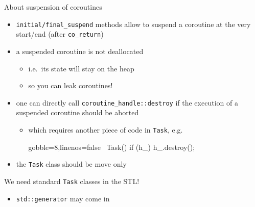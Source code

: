 \begin{frame}[fragile]
  \begin{block}{About suspension of coroutines}
    \begin{itemize}
    \item \texttt{initial/final_suspend} methods allow to suspend a coroutine at the very start/end (after \texttt{co_return})
    \item a suspended coroutine is not deallocated
      \begin{itemize}
      \item i.e.\ its state will stay on the heap
      \item so you can leak coroutines!
      \end{itemize}
    \item one can directly call \texttt{coroutine_handle::destroy} if the execution of a suspended coroutine should be aborted
      \begin{itemize}
      \item which requires another piece of code in \texttt{Task}, e.g.
        {\scriptsize
          \begin{cppcode*}{gobble=8,linenos=false}
            ~Task() { if (h_) h_.destroy(); }
          \end{cppcode*}
        }
      \end{itemize}
    \item the \texttt{Task} class should be move only
     \end{itemize}
  \end{block}
  \begin{alertblock}{We need standard \texttt{Task} classes in the STL!}
    \begin{itemize}
    \item \texttt{std::generator} may come in 
     \end{itemize}
    \end{alertblock}
\end{frame}

